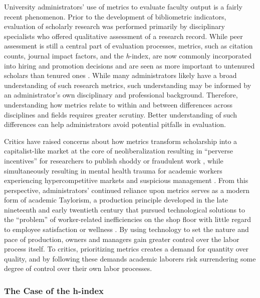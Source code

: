\documentclass[
  10pt,
  letterpaper,
]{article}
\begin{document}
University administrators' use of metrics to evaluate faculty output is
a fairly recent phenomenon. Prior to the development of bibliometric
indicators, evaluation of scholarly research was performed primarily by
disciplinary specialists who offered qualitative assessment of a
research record. While peer assessment is still a central part of
evaluation processes, metrics, such as citation counts, journal impact
factors, and the \emph{h}-index, are now commonly incorporated into
hiring and promotion decisions \citep{mckiernan_metaresearch_2019} and
are seen as more important to untenured scholars than tenured ones
\citep{niles_why_2020}. While many administrators likely have a broad
understanding of such research metrics, such understanding may be
informed by an administrator's own disciplinary and professional
background. Therefore, understanding how metrics relate to within and
between differences across disciplines and fields requires greater
scrutiny. Better understanding of such differences can help
administrators avoid potential pitfalls in evaluation.

Critics have raised concerns about how metrics transform scholarship
into a capitalist-like market at the core of neoliberalization resulting
in ``perverse incentives'' for researchers to publish shoddy or
fraudulent work \citep{edwards_academic_2017}, while simultaneously
resulting in mental health trauma for academic workers experiencing
hypercompetitive markets and suspicious management
\citep{forrester_mental_2021}. From this perspective, administrators'
continued reliance upon metrics serves as a modern form of academic
Taylorism, a production principle developed in the late nineteenth and
early twentieth century that pursued technological solutions to the
``problem'' of worker-related inefficiencies on the shop floor with
little regard to employee satisfaction or wellness
\citep{braverman_labor_1998}. By using technology to set the nature and
pace of production, owners and managers gain greater control over the
labor process itself. To critics, prioritizing metrics creates a demand
for quantity over quality, and by following these demands academic
laborers risk surrendering some degree of control over their own labor
processes.

\subsubsection{The Case of the h-index}\label{the-case-of-the-h-index}
\end{document}
